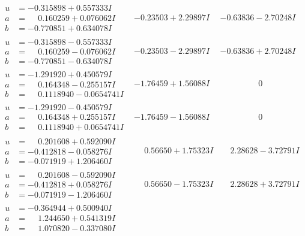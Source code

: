 \documentclass[1p]{elsarticle_modified}
\theoremstyle{definition}
\begin{document}
$$\begin{array}{c|c|c}
\begin{aligned}
u &= -0.315898 + 0.557333 I \\
a &= \phantom{-}0.160259 + 0.076062 I \\
b &= -0.770851 + 0.634078 I\end{aligned}
 & -0.23503 + 2.29897 I & -0.63836 - 2.70248 I \\ \hline\begin{aligned}
u &= -0.315898 - 0.557333 I \\
a &= \phantom{-}0.160259 - 0.076062 I \\
b &= -0.770851 - 0.634078 I\end{aligned}
 & -0.23503 - 2.29897 I & -0.63836 + 2.70248 I \\ \hline\begin{aligned}
u &= -1.291920 + 0.450579 I \\
a &= \phantom{-}0.164348 - 0.255157 I \\
b &= \phantom{-}0.1118940 - 0.0654741 I\end{aligned}
 & -1.76459 + 1.56088 I & \phantom{-0.000000 } 0 \\ \hline\begin{aligned}
u &= -1.291920 - 0.450579 I \\
a &= \phantom{-}0.164348 + 0.255157 I \\
b &= \phantom{-}0.1118940 + 0.0654741 I\end{aligned}
 & -1.76459 - 1.56088 I & \phantom{-0.000000 } 0 \\ \hline\begin{aligned}
u &= \phantom{-}0.201608 + 0.592090 I \\
a &= -0.412818 - 0.058276 I \\
b &= -0.071919 + 1.206460 I\end{aligned}
 & \phantom{-}0.56650 + 1.75323 I & \phantom{-}2.28628 - 3.72791 I \\ \hline\begin{aligned}
u &= \phantom{-}0.201608 - 0.592090 I \\
a &= -0.412818 + 0.058276 I \\
b &= -0.071919 - 1.206460 I\end{aligned}
 & \phantom{-}0.56650 - 1.75323 I & \phantom{-}2.28628 + 3.72791 I \\ \hline\begin{aligned}
u &= -0.364944 + 0.500940 I \\
a &= \phantom{-}1.244650 + 0.541319 I \\
b &= \phantom{-}1.070820 - 0.337080 I\end{aligned}

\end{array}$$
\end{document}
